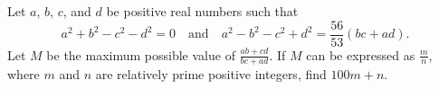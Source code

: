 Let $a$, $b$, $c$, and $d$ be positive real numbers such that
\[
a^2 + b^2 - c^2 - d^2 = 0 \quad \text{and} \quad
a^2 - b^2 - c^2 + d^2 = \frac{56}{53}(bc + ad).\]
Let $M$ be the maximum possible value of $\frac{ab+cd}{bc+ad}$. If $M$ can be expressed as $\frac{m}{n}$, where $m$ and $n$ are relatively prime positive integers, find $100m + n$.
